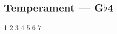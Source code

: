\subsection{Temperament --- \UiKey{\I}\UiKey{\SET}G$\flat$4}










































1
2
3
4
5
6
7
